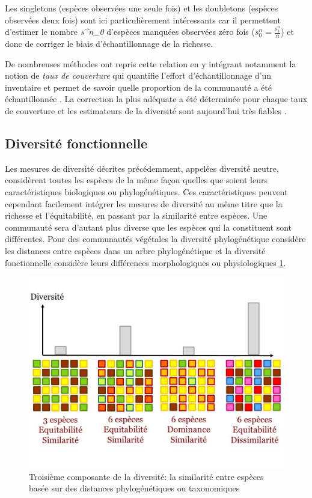 \documentclass[
  11pt,
  french,
  A4paper,
  extrafontsizes,onecolumn,openright
  ]{memoir}
\begin{document}
Les singletons (espèces observées une seule fois) et les doubletons
(espèces observées deux fois) sont ici particulièrement intéressants car
il permettent d'estimer le nombre \emph{s\^{}n\_0} d'espèces manquées
observées zéro fois (\(s^n_0=\frac{s^n_1}{n}\)) et donc de corriger le
biais d'échantillonnage de la richesse.

De nombreuses méthodes ont repris cette relation en y intégrant
notamment la notion de \emph{taux de couverture} qui quantifie l'effort
d'échantillonnage d'un inventaire et permet de savoir quelle proportion
de la communauté a été échantillonnée \autocite{Dauby2012}. La
correction la plus adéquate a été déterminée pour chaque taux de
couverture et les estimateurs de la diversité sont aujourd'hui très
fiables \autocites{Chao2015}{Marcon2015b}.

\subsection{Diversité fonctionnelle}\label{diversite-fonctionnelle}

Les mesures de diversité décrites précédemment, appelées diversité
neutre, considèrent toutes les espèces de la même façon quelles que
soient leurs caractéristiques biologiques ou phylogénétiques. Ces
caractéristiques peuvent cependant facilement intégrer les mesures de
diversité au même titre que la richesse et l'équitabilité, en passant
par la similarité entre espèces. Une communauté sera d'autant plus
diverse que les espèces qui la constituent sont différentes. Pour des
communautés végétales la diversité phylogénétique considère les
distances entre espèces dans un arbre phylogénétique et la diversité
fonctionnelle considère leurs différences morphologiques ou
physiologiques \ref{fig:RichEquSim}.

\begin{figure}

{\centering \includegraphics[width=0.6\linewidth]{ExternalFig/Fig_RichnessEquitabilitySimilarity} 

}

\caption{Troisième composante de la diversité: la similarité entre espèces basée sur des distances phylogénétiques ou taxonomiques}\label{fig:RichEquSim}
\end{figure}
\end{document}
